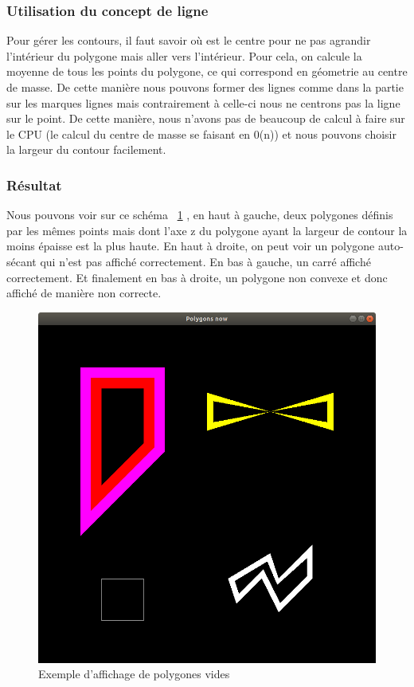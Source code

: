 \documentclass[12pt]{article}
\begin{document}
\subsubsection{Utilisation du concept de ligne}

Pour gérer les contours, il faut savoir où est le centre pour ne pas agrandir l'intérieur du polygone
mais aller vers l'intérieur. Pour cela, on calcule la moyenne de tous les points du polygone, ce qui
correspond en géometrie au centre de masse.
De cette manière nous pouvons former des lignes comme dans la partie sur les marques lignes mais contrairement à celle-ci nous ne centrons pas la ligne sur le point. De cette manière, nous n'avons pas
de beaucoup de calcul à faire sur le CPU (le calcul du centre de masse se faisant en 0(n)) et nous pouvons
choisir la largeur du contour facilement.

\subsubsection{Résultat}

Nous pouvons voir sur ce schéma ~\ref{fig:capture_polygon_non_fill} , en haut à gauche, deux polygones définis par les mêmes points mais dont l'axe z du polygone ayant la largeur de contour la moins épaisse est la plus haute.
En haut à droite, on peut voir un polygone auto-sécant qui n'est pas affiché correctement.
En bas à gauche, un carré affiché correctement. Et finalement en bas à droite, un polygone non convexe et donc affiché de manière non correcte.

\begin{figure}[htp]
  \centering
  \includegraphics[scale=0.5]{images/polygon_capture}
  \caption{Exemple d'affichage de polygones vides}
  \label{fig:capture_polygon_non_fill}
\end{figure}
\end{document}
